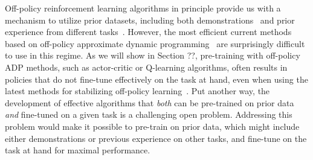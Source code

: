 Off-policy reinforcement learning algorithms in principle provide us with a mechanism to utilize prior datasets, including both demonstrations~\cite{} and prior experience from different tasks~\cite{}. However, the most efficient current methods based on off-policy approximate dynamic programming~\cite{} are surprisingly difficult to use in this regime. As we will show in Section ??, pre-training with off-policy ADP methods, such as actor-critic or Q-learning algorithms, often results in policies that do not fine-tune effectively on the task at hand, even when using the latest methods for stabilizing off-policy learning~\cite{}. Put another way, the development of effective algorithms that \emph{both} can be pre-trained on prior data \emph{and} fine-tuned on a given task is a challenging open problem. Addressing this problem would make it possible to pre-train on prior data, which might include either demonstrations or previous experience on other tasks, and fine-tune on the task at hand for maximal performance.

